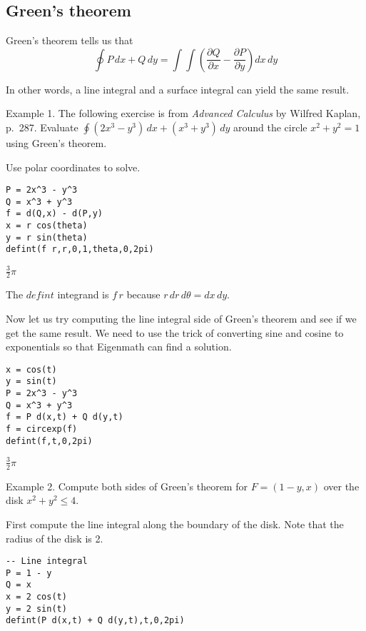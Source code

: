
\subsection{Green's theorem}
Green's theorem tells us that
$$\oint P\,dx+Q\,dy=\int\!\!\!\int
\left(\frac{\partial Q}{\partial x}-\frac{\partial P}{\partial y}\right)
dx\,dy$$

\noindent
In other words, a line integral and a surface integral can yield
the same result.

\bigskip
\noindent
Example 1.
The following exercise is from {\it Advanced Calculus}
by Wilfred Kaplan, p.~287.
Evaluate $\oint (2x^3-y^3)\,dx+(x^3+y^3)\,dy$ around the circle
$x^2+y^2=1$ using Green's theorem.

\bigskip
\noindent
Use polar coordinates to solve.

\begin{Verbatim}[formatcom=\color{blue},samepage=true]
P = 2x^3 - y^3
Q = x^3 + y^3
f = d(Q,x) - d(P,y)
x = r cos(theta)
y = r sin(theta)
defint(f r,r,0,1,theta,0,2pi)
\end{Verbatim}

\noindent
$\displaystyle \tfrac{3}{2}\pi$

\bigskip
\noindent
The $defint$ integrand is $f\,r$ because $r\,dr\,d\theta=dx\,dy$.

\bigskip
\noindent
Now let us try computing the line integral side of Green's theorem
and see if we get the same result.
We need to use the trick of converting sine and cosine to exponentials
so that Eigenmath can find a solution.

\begin{Verbatim}[formatcom=\color{blue},samepage=true]
x = cos(t)
y = sin(t)
P = 2x^3 - y^3
Q = x^3 + y^3
f = P d(x,t) + Q d(y,t)
f = circexp(f)
defint(f,t,0,2pi)
\end{Verbatim}

\noindent
$\displaystyle \tfrac{3}{2}\pi$

\bigskip
\noindent
Example 2.
Compute both sides of Green's theorem for
$F=(1-y,x)$ over the disk $x^2+y^2\le4$.

\bigskip
\noindent
First compute the line integral along the boundary of the disk.
Note that the radius of the disk is 2.

\begin{Verbatim}[formatcom=\color{blue},samepage=true]
-- Line integral
P = 1 - y
Q = x
x = 2 cos(t)
y = 2 sin(t)
defint(P d(x,t) + Q d(y,t),t,0,2pi)
\end{Verbatim}

